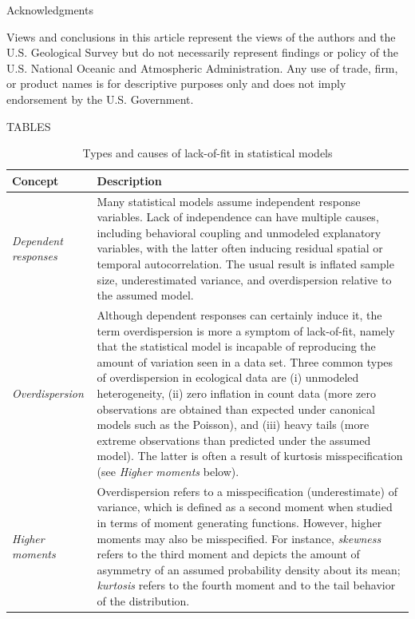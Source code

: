 \documentclass[12pt,english]{article}
\begin{document}
\begin{spacing}{1.9}
\centerline{\sc Acknowledgments} Views and conclusions in this article represent the views of the authors and the U.S. Geological Survey but do not necessarily represent findings or policy of the U.S. National Oceanic and Atmospheric Administration.  Any use of trade, firm, or product names is for descriptive purposes only and does not imply endorsement by the U.S. Government.

\renewcommand{\refname}{Literature Cited}




\pagebreak




TABLES

\begin{table}[ht]
\caption{Types and causes of lack-of-fit in statistical models}
\label{tab:lof}
\centering
\begin{tabular}{p{3cm}p{13cm}}
  \hline
  Concept & Description \\
  \hline
     \textit{Dependent responses} & Many statistical models assume independent response variables.  Lack of independence can have multiple causes, including behavioral coupling and unmodeled explanatory variables, with the latter often inducing residual spatial or temporal autocorrelation.  The usual result is inflated sample size, underestimated variance, and overdispersion relative to the assumed model. \\
   \textit{Overdispersion} & Although dependent responses can certainly induce it, the term overdispersion is more a symptom of lack-of-fit, namely that the statistical model is incapable of reproducing the amount of variation seen in a data set.  Three common types of overdispersion in ecological data are (i) unmodeled heterogeneity, (ii) zero inflation in count data (more zero observations are obtained than expected under canonical models such as the Poisson), and (iii) heavy tails (more extreme observations than predicted under the assumed model). The latter is often a result of kurtosis misspecification (see \textit{Higher moments} below).\\
   \textit{Higher moments} & Overdispersion refers to a misspecification (underestimate) of variance, which is defined as a second moment when studied in terms of moment generating functions.  However, higher moments may also be misspecified. For instance, \textit{skewness} refers to the third moment and depicts the amount of asymmetry of an assumed probability density about its mean; \textit{kurtosis} refers to the fourth moment and to the tail behavior of the distribution.  \\

\end{tabular}
\end{table}
\end{spacing}
\end{document}
